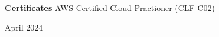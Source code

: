 \documentclass [11pt]{article}
\begin{document}
\begin{flushleft}
‭‭%

‭‭%

\raggedright

\vspace{7}
\underline{\textbf{Certificates}}
\linebreak
AWS Certified Cloud Practioner (CLF-C02)\begin{minipage}{0.63 \linewidth}\begin{flushright}April 2024\end{flushright}\end{minipage}
\end{flushleft}
\end{document}
